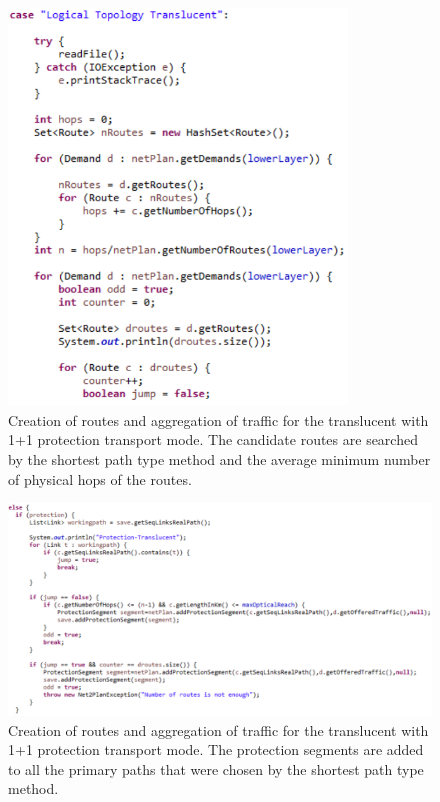 \begin{figure}[H]
\centering
\includegraphics[width=9cm]{sdf/heuristic/translucent_protection/figures/grooming_translucent_protec1}
\caption{Creation of routes and aggregation of traffic for the translucent with 1+1 protection transport mode. The candidate routes are searched by the shortest path type method and the average minimum number of physical hops of the routes.}
\label{grooming_translucent_protec1}
\end{figure}

\begin{figure}[H]
\centering
\includegraphics[width=17cm]{sdf/heuristic/translucent_protection/figures/grooming_translucent_protec2}
\caption{Creation of routes and aggregation of traffic for the translucent with 1+1 protection transport mode. The protection segments are added to all the primary paths that were chosen by the shortest path type method.}
\label{grooming_translucent_protec2}
\end{figure}

